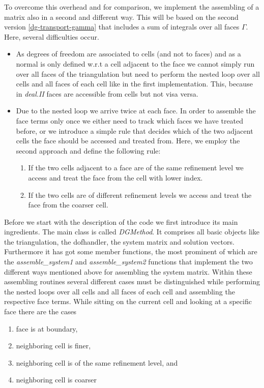 \documentclass[11pt]{article}
\begin{document}
To overcome this overhead and for comparison, we implement the
assembling of a matrix also in a second and different way. This will
be based on the second version \eqref{dg-transport-gamma} that
includes a sum of integrals over all faces $\Gamma$. Here, several
difficulties occur.
\begin{itemize}
\item As degrees of freedom are associated to cells (and not to faces)
  and as a normal is only defined w.r.t a cell adjacent to the face we
  cannot simply run over all faces of the triangulation but need to
  perform the nested loop over all cells and all faces of each cell
  like in the first implementation.  This, because in \emph{deal.II}
  faces are accessible from cells but not visa versa.
\item Due to the nested loop we arrive twice at each face. In order to
  assemble the face terms only once we either need to track which
  faces we have treated before, or we introduce a simple rule that decides
  which of the two adjacent cells the face should be accessed and
  treated from.  Here, we employ the second approach and define the
  following rule:
  \begin{enumerate}
  \renewcommand{\labelenumi}{\alph{enumi})}
  \item If the two cells adjacent to a face are of the same refinement level we access and treat the face from the cell with lower index.
  \item If the two cells are of different refinement levels we access
    and treat the face from the coarser cell.
  \end{enumerate}
\end{itemize}
Before we start with the description of the code we first introduce
its main ingredients. The main class is called
\emph{DGMethod}. It comprises all basic objects like the
triangulation, the dofhandler, the system matrix and solution vectors.
Furthermore it has got some member functions, the most prominent of
which are the \emph{assemble\_system1} and \emph{assemble\_system2}
functions that implement the two different ways mentioned above for
assembling the system matrix. Within these assembling routines several
different cases must be distinguished while performing the nested
loops over all cells and all faces of each cell and assembling the
respective face terms. While sitting on the current cell and looking
at a specific face there are the cases
\begin{enumerate}
\item face is at boundary,
\item neighboring cell is finer,
\item neighboring cell is of the same refinement level, and
\item neighboring cell is coarser
\end{enumerate}
\end{document}
